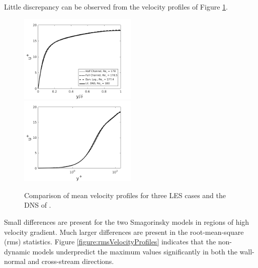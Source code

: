 \documentclass[12pt,oneside,a4paper]{article}
\begin{document}
Little discrepancy can be observed from the velocity profiles of Figure \ref{figure:velocityProfiles}.
\begin{figure}[!t]	
\centering
\includegraphics[width=0.5\textwidth]{images/Mean_Vel_linear.png}\hfill
\includegraphics[width=0.5\textwidth]{images/Mean_Vel_log.png}
\caption{Comparison of mean velocity profiles for three LES cases and the DNS of \cite{vreman2014}.}
\label{figure:velocityProfiles}
\end{figure}
Small differences are present for the two Smagorinsky models in regions of high velocity gradient. Much larger differences are present in the root-mean-square (rms) statistics. Figure \ref{figure:rmsVelocityProfiles} indicates that the non-dynamic models underpredict the maximum values significantly in both the wall-normal and cross-stream directions.
\end{document}
